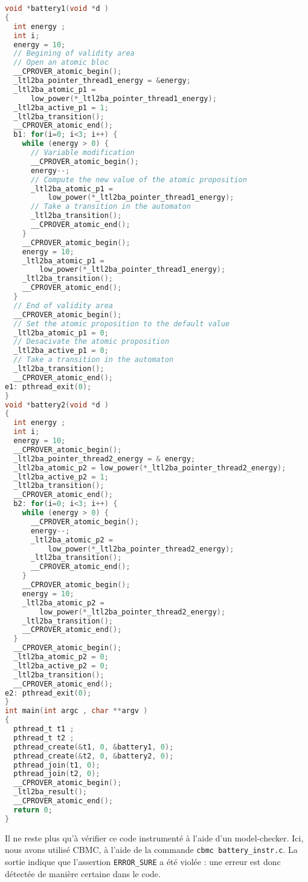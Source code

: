 \begin{lstlisting}[language=C, frame=single, caption=Code instrumenté]
void *battery1(void *d )
{
  int energy ;
  int i;
  energy = 10;
  // Begining of validity area
  // Open an atomic bloc
  __CPROVER_atomic_begin();
  _ltl2ba_pointer_thread1_energy = &energy;
  _ltl2ba_atomic_p1 =
      low_power(*_ltl2ba_pointer_thread1_energy);
  _ltl2ba_active_p1 = 1;
  _ltl2ba_transition();
  __CPROVER_atomic_end();
  b1: for(i=0; i<3; i++) {
    while (energy > 0) {
      // Variable modification
      __CPROVER_atomic_begin();
      energy--;
      // Compute the new value of the atomic proposition
      _ltl2ba_atomic_p1 =
          low_power(*_ltl2ba_pointer_thread1_energy);
      // Take a transition in the automaton
      _ltl2ba_transition();
      __CPROVER_atomic_end();
    }
    __CPROVER_atomic_begin();
    energy = 10;
    _ltl2ba_atomic_p1 =
        low_power(*_ltl2ba_pointer_thread1_energy);
    _ltl2ba_transition();
    __CPROVER_atomic_end();
  }
  // End of validity area
  __CPROVER_atomic_begin();
  // Set the atomic proposition to the default value
  _ltl2ba_atomic_p1 = 0;
  // Desacivate the atomic proposition
  _ltl2ba_active_p1 = 0;
  // Take a transition in the automaton
  _ltl2ba_transition();
  __CPROVER_atomic_end();
e1: pthread_exit(0);
}
void *battery2(void *d )
{
  int energy ;
  int i;
  energy = 10;
  __CPROVER_atomic_begin();
  _ltl2ba_pointer_thread2_energy = & energy;
  _ltl2ba_atomic_p2 = low_power(*_ltl2ba_pointer_thread2_energy);
  _ltl2ba_active_p2 = 1;
  _ltl2ba_transition();
  __CPROVER_atomic_end();
  b2: for(i=0; i<3; i++) {
    while (energy > 0) {
      __CPROVER_atomic_begin();
      energy--;
      _ltl2ba_atomic_p2 =
          low_power(*_ltl2ba_pointer_thread2_energy);
      _ltl2ba_transition();
      __CPROVER_atomic_end();
    }
    __CPROVER_atomic_begin();
    energy = 10;
    _ltl2ba_atomic_p2 =
        low_power(*_ltl2ba_pointer_thread2_energy);
    _ltl2ba_transition();
    __CPROVER_atomic_end();
  }
  __CPROVER_atomic_begin();
  _ltl2ba_atomic_p2 = 0;
  _ltl2ba_active_p2 = 0;
  _ltl2ba_transition();
  __CPROVER_atomic_end();
e2: pthread_exit(0);
}
int main(int argc , char **argv )
{
  pthread_t t1 ;
  pthread_t t2 ;
  pthread_create(&t1, 0, &battery1, 0);
  pthread_create(&t2, 0, &battery2, 0);
  pthread_join(t1, 0);
  pthread_join(t2, 0);
  __CPROVER_atomic_begin();
  _ltl2ba_result();
  __CPROVER_atomic_end();
  return 0;
}
\end{lstlisting}

Il ne reste plus qu'à vérifier ce code instrumenté à l'aide d'un model-checker.
Ici, nous avons utilisé CBMC, à l'aide de la commande \texttt{cbmc
  battery\_instr.c}. La sortie indique que l'assertion \texttt{ERROR\_SURE} a été
violée : une erreur est donc détectée de manière certaine dans le code.